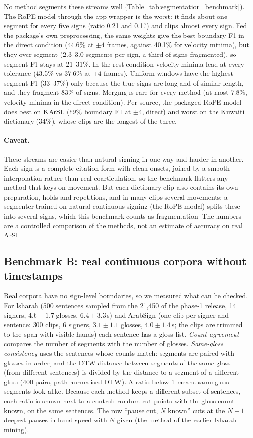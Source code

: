 No method segments these streams well (Table~\ref{tab:segmentation_benchmark}). The RoPE model through the app
wrapper is the worst: it finds about one segment for every five signs (ratio 0.21 and 0.17) and clips almost every
sign. Fed the package's own preprocessing, the same weights give the best boundary F1 in the direct condition
(44.6\% at $\pm4$ frames, against 40.1\% for velocity minima), but they over-segment (2.3--3.0 segments per sign,
a third of signs fragmented), so segment F1 stays at 21--31\%. In the rest condition velocity minima lead at every
tolerance (43.5\% vs 37.6\% at $\pm4$ frames). Uniform windows
have the highest segment F1 (33--37\%) only because the true signs are long and of similar length, and they fragment
83\% of signs. Merging is rare for every method (at most 7.8\%, velocity minima in the direct condition).
Per source, the packaged RoPE model does best on KArSL (59\% boundary F1 at $\pm4$, direct) and worst on the Kuwaiti
dictionary (34\%), whose clips are the longest of the three.

\paragraph{Caveat.} These streams are easier than natural signing in one way and harder in another. Each sign is a
complete citation form with clean onsets, joined by a smooth interpolation rather than real coarticulation, so the
benchmark flatters any method that keys on movement. But each dictionary clip also contains its own preparation,
holds and repetitions, and in many clips several movements; a segmenter trained on natural continuous signing
(the RoPE model) splits these into several signs, which this benchmark counts as fragmentation. The numbers are a
controlled comparison of the methods, not an estimate of accuracy on real ArSL.

\subsection{Benchmark B: real continuous corpora without timestamps}
Real corpora have no sign-level boundaries, so we measured what can be checked. For Isharah (500 sentences sampled
from the 21,450 of the phase-1 release, 14 signers, $4.6 \pm 1.7$ glosses, $6.4 \pm 3.3$\,s) and ArabSign (one clip per
signer and sentence: 300 clips, 6 signers, $3.1 \pm 1.1$ glosses, $4.0 \pm 1.4$\,s; the clips are trimmed to the span with
visible hands) each sentence has a gloss list. \emph{Count agreement} compares the number of segments with the number
of glosses. \emph{Same-gloss consistency} uses the sentences whose counts match: segments are paired with glosses in
order, and the DTW distance between segments of the same gloss (from different sentences) is divided by the distance
to a segment of a different gloss (400 pairs, path-normalised DTW). A ratio below 1 means same-gloss segments look alike.
Because each method keeps a different subset of sentences, each ratio is shown next to a control: random cut points
with the gloss count known, on the same sentences. The row ``pause cut, $N$ known'' cuts at the $N{-}1$ deepest
pauses in hand speed with $N$ given (the method of the earlier Isharah mining).


